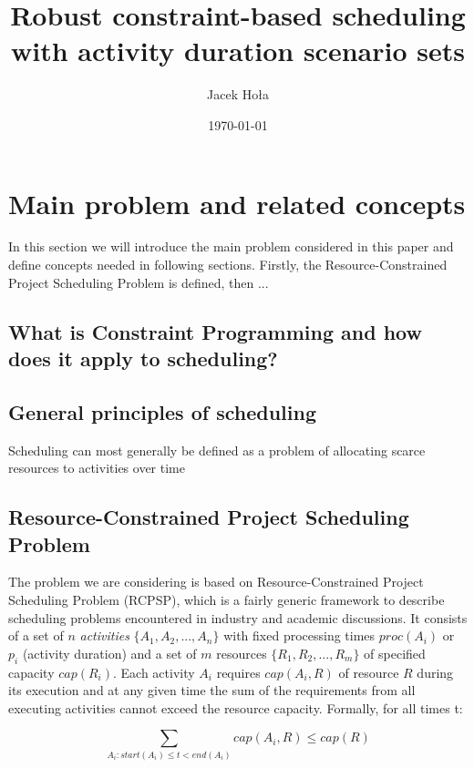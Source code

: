 \documentclass{article}
\theoremstyle{definition}
\begin{document}
 

\title{Robust constraint-based scheduling with activity duration scenario sets}
\author{Jacek Hoła}
\date{\today}
\maketitle
\newpage

\tableofcontents
\newpage

\section{Main problem and related concepts}
In this section we will introduce the main problem considered in this paper and define concepts needed in following sections. Firstly, the Resource-Constrained Project Scheduling Problem is defined, then ...

\subsection{What is Constraint Programming and how does it apply to scheduling?}

\subsection{General principles of scheduling}
Scheduling can most generally be defined as a problem of allocating scarce resources to activities over time \cite{Baker:Introduction}

\subsection{Resource-Constrained Project Scheduling Problem}
The problem we are considering is based on Resource-Constrained Project Scheduling Problem (RCPSP), which is a fairly generic framework to describe scheduling problems encountered in industry and academic discussions. It consists of a set of $n$ \textit{activities} $\{A_1, A_2, ..., A_n\}$ with fixed processing times $proc(A_i)$ or $p_i$ (activity duration) and a set of $m$ resources $\{R_1, R_2, ..., R_m\}$ of specified capacity $cap(R_i)$. Each activity $A_i$ requires $cap(A_i, R)$ of resource $R$ during its execution and at any given time the sum of the requirements from all executing activities cannot exceed the resource capacity. Formally, for all times t:

$$
\sum_{A_i : start(A_i) \leq t < end(A_i)} cap(A_i, R) \leq cap(R)
$$
\end{document}
